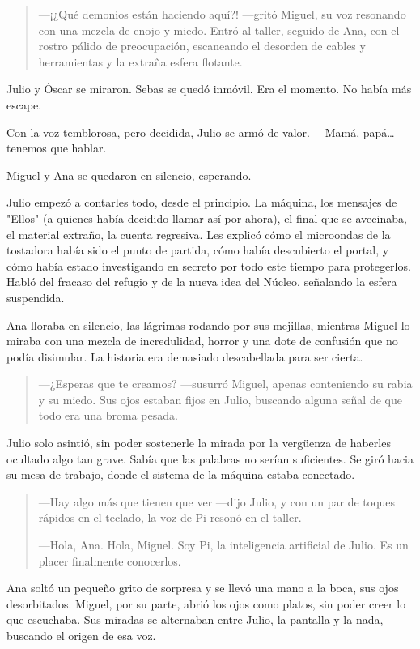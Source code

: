 \documentclass[a4paper,12pt]{book}
\begin{document}
\begin{quote}
    —¡¿Qué demonios están haciendo aquí?! —gritó Miguel, su voz resonando con una mezcla de enojo y miedo. Entró al taller, seguido de Ana, con el rostro pálido de preocupación, escaneando el desorden de cables y herramientas y la extraña esfera flotante.
\end{quote}

Julio y Óscar se miraron. Sebas se quedó inmóvil. Era el momento. No había más escape.

Con la voz temblorosa, pero decidida, Julio se armó de valor. —Mamá, papá… tenemos que hablar.

Miguel y Ana se quedaron en silencio, esperando.

Julio empezó a contarles todo, desde el principio. La máquina, los mensajes de "Ellos" (a quienes había decidido llamar así por ahora), el final que se avecinaba, el material extraño, la cuenta regresiva. Les explicó cómo el microondas de la tostadora había sido el punto de partida, cómo había descubierto el portal, y cómo había estado investigando en secreto por todo este tiempo para protegerlos. Habló del fracaso del refugio y de la nueva idea del Núcleo, señalando la esfera suspendida.

Ana lloraba en silencio, las lágrimas rodando por sus mejillas, mientras Miguel lo miraba con una mezcla de incredulidad, horror y una dote de confusión que no podía disimular. La historia era demasiado descabellada para ser cierta.

\begin{quote}
    —¿Esperas que te creamos? —susurró Miguel, apenas conteniendo su rabia y su miedo. Sus ojos estaban fijos en Julio, buscando alguna señal de que todo era una broma pesada.
\end{quote}

Julio solo asintió, sin poder sostenerle la mirada por la vergüenza de haberles ocultado algo tan grave. Sabía que las palabras no serían suficientes. Se giró hacia su mesa de trabajo, donde el sistema de la máquina estaba conectado.

\begin{quote}
    —Hay algo más que tienen que ver —dijo Julio, y con un par de toques rápidos en el teclado, la voz de Pi resonó en el taller.

    —Hola, Ana. Hola, Miguel. Soy Pi, la inteligencia artificial de Julio. Es un placer finalmente conocerlos.
\end{quote}

Ana soltó un pequeño grito de sorpresa y se llevó una mano a la boca, sus ojos desorbitados. Miguel, por su parte, abrió los ojos como platos, sin poder creer lo que escuchaba. Sus miradas se alternaban entre Julio, la pantalla y la nada, buscando el origen de esa voz.
\end{document}
